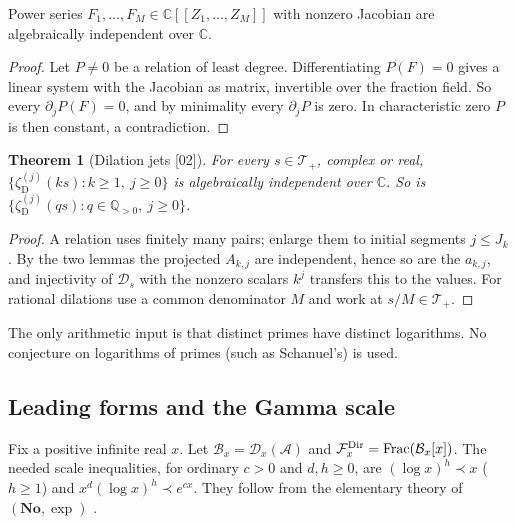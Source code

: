 \documentclass[11pt,a4paper]{article}
\numberwithin{equation}{section}
\newtheorem{theorem}{Theorem}[section]
\theoremstyle{definition}
\theoremstyle{remark}
\newcommand{\No}{\mathbf{No}}
\newcommand{\C}{\mathbb C}
\newcommand{\Q}{\mathbb Q}
\newcommand{\Frac}{\operatorname{Frac}}
\newcommand{\zD}{\zeta_{\mathrm D}}
\newcommand{\DD}{\mathcal D}
\newcommand{\Arith}{\mathcal A}
\newcommand{\Tp}{\mathcal T_{+}}
\newcommand{\src}[1]{\textup{[#1]}}
\begin{document}
\begin{lemma}[Formal Jacobian criterion \src{02}]\label{gz:lem:jaccriterion}
Power series $F_1,\dots,F_M\in\C[[Z_1,\dots,Z_M]]$ with nonzero Jacobian are
algebraically independent over $\C$.
\end{lemma}
\begin{proof}
Let $P\ne0$ be a relation of least degree. Differentiating $P(F)=0$ gives a
linear system with the Jacobian as matrix, invertible over the fraction
field. So every $\partial_jP(F)=0$, and by minimality every $\partial_jP$ is
zero. In characteristic zero $P$ is then constant, a contradiction.
\end{proof}

\begin{theorem}[Dilation jets \src{02}]\label{gz:thm:zetajets}
For every $s\in\Tp$, complex or real, $\{\zD^{(j)}(ks):k\ge1,\ j\ge0\}$ is
algebraically independent over $\C$. So is
$\{\zD^{(j)}(qs):q\in\Q_{>0},\ j\ge0\}$.
\end{theorem}
\begin{proof}
A relation uses finitely many pairs; enlarge them to initial segments
$j\le J_k$. By the two lemmas the projected $A_{k,j}$ are independent, hence
so are the $a_{k,j}$, and injectivity of $\DD_s$ with the nonzero scalars
$k^j$ transfers this to the values. For rational dilations use a common
denominator $M$ and work at $s/M\in\Tp$.
\end{proof}
The only arithmetic input is that distinct primes have distinct logarithms.
No conjecture on logarithms of primes (such as Schanuel's) is used.

\subsection{Leading forms and the Gamma scale}\label{gz:sec:leading}
Fix a positive infinite real $x$. Let $\mathcal B_x=\DD_x(\Arith)$ and
$\mathcal F_x^{\rm Dir}=\Frac(\mathcal B_x[x])$. The needed scale
inequalities, for ordinary $c>0$ and $d,h\ge0$, are
$(\log x)^h\prec x$ ($h\ge1$) and $x^d(\log x)^h\prec e^{cx}$. They follow
from the elementary theory of $(\No,\exp)$ \cite{vdDE}.
\end{document}
